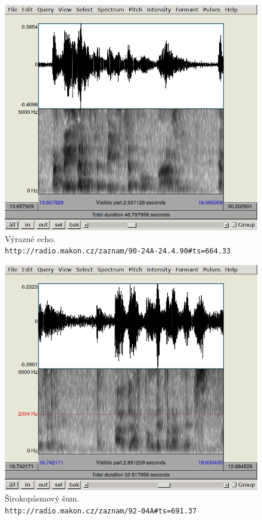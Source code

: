 \begin{figure}[htpb]
\includegraphics[scale=0.88]{rc/spectrum-echo-90-24A.png}
\caption{
    Výrazné echo.\\
    \texttt{http://radio.makon.cz/zaznam/90-24A-24.4.90\#ts=664.33}
}
\label{fig:spectr-echo}
\end{figure}

\begin{figure}[htpb]
\includegraphics[scale=0.88]{rc/spectrum-noise-92-04A.png}
\caption{
    Širokopásmový šum.\\
    \texttt{http://radio.makon.cz/zaznam/92-04A\#ts=691.37}
}
\label{fig:spectr-noise}
\end{figure}

